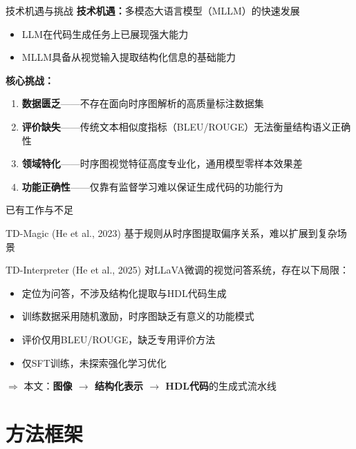 \documentclass[aspectratio=169,10pt]{beamer}
\begin{document}
\begin{frame}{技术机遇与挑战}
\textbf{技术机遇：}多模态大语言模型（MLLM）的快速发展
\begin{itemize}
  \item LLM在代码生成任务上已展现强大能力
  \item MLLM具备从视觉输入提取结构化信息的基础能力
\end{itemize}

\vspace{0.5em}
\textbf{核心挑战：}
\begin{enumerate}
  \item \textbf{数据匮乏}——不存在面向时序图解析的高质量标注数据集
  \item \textbf{评价缺失}——传统文本相似度指标（BLEU/ROUGE）无法衡量结构语义正确性
  \item \textbf{领域特化}——时序图视觉特征高度专业化，通用模型零样本效果差
  \item \textbf{功能正确性}——仅靠有监督学习难以保证生成代码的功能行为
\end{enumerate}
\end{frame}

\begin{frame}{已有工作与不足}
\begin{block}{TD-Magic (He et al., 2023)}
基于规则从时序图提取偏序关系，难以扩展到复杂场景
\end{block}

\begin{block}{TD-Interpreter (He et al., 2025)}
对LLaVA微调的视觉问答系统，存在以下局限：
\begin{itemize}
  \item 定位为问答，\alert{不涉及结构化提取与HDL代码生成}
  \item 训练数据采用随机激励，时序图缺乏有意义的功能模式
  \item 评价仅用BLEU/ROUGE，缺乏专用评价方法
  \item 仅SFT训练，未探索强化学习优化
\end{itemize}
\end{block}

\vspace{0.3em}
\centering
$\Longrightarrow$ 本文：\textbf{图像 $\to$ 结构化表示 $\to$ HDL代码}的生成式流水线
\end{frame}

\section{方法框架}
\end{document}
